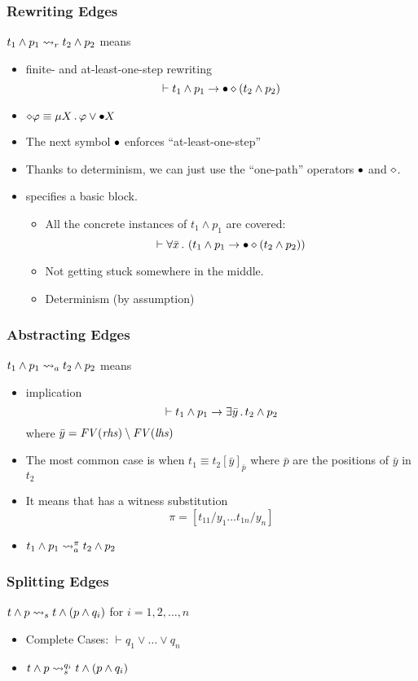 \documentclass{beamer}
\begin{document}
\begin{frame}
\frametitle{Rewriting Edges}
$t_1 \land p_1 \rightsquigarrow_r t_2 \land p_2$ means
\begin{itemize}
\item finite- and at-least-one-step rewriting 
      \begin{equation}\label{eq:tor}
      \vdash t_1 \land p_1 \rightarrow \mathord{\bullet} \diamond (t_2 \land p_2)
      \end{equation}
\item $\diamond \varphi \equiv \mu X \,.\, \varphi \lor \mathord{\bullet} X$
\item The next symbol $\mathord{\bullet}$ enforces ``at-least-one-step''
\item Thanks to determinism, we can just use the ``one-path'' operators
      $\mathord{\bullet}$ and $\diamond$.
\item {} specifies a basic block.
\begin{itemize}
\item All the concrete instances of $t_1 \land p_1$ are covered:
\[\vdash \forall \bar{x}
   \,.\, \left( t_1 \land p_1 \rightarrow \mathord{\bullet} \diamond (t_2 \land p_2) \right)\]
\item Not getting stuck somewhere in the middle.
\item Determinism (by assumption)
\end{itemize}
\end{itemize}
\end{frame}

\begin{frame}
\frametitle{Abstracting Edges}
$t_1 \land p_1 \rightsquigarrow_a t_2 \land p_2$ means
\begin{itemize}
\item implication
      \begin{equation}\label{eq:toa}
      \vdash t_1 \land p_1 \rightarrow \exists \bar{y} \,.\, t_2 \land p_2
      \end{equation}
      where $\bar{y} = \mathit{FV(rhs)} \setminus \mathit{FV(lhs)}$
\item The most common case is when
      $t_1 \equiv t_2[\bar{y}]_{\bar{p}}$ where $\bar{p}$ are the positions of $\bar{y}$ in $t_2$
\item It means that  has a witness substitution
      \[\pi = [t_{11} / y_1 \dots t_{1n} / y_n]\]
\item $t_1 \land p_1 \rightsquigarrow_a^\pi t_2 \land p_2$
\end{itemize}
\end{frame}

\begin{frame}
\frametitle{Splitting Edges}
$t \land p \rightsquigarrow_s t \land (p \land q_i)$ for $i = 1, 2, \dots, n$
\begin{itemize}
\item Complete Cases: $\vdash q_1 \lor \dots \lor q_n$
\item $t \land p \rightsquigarrow_s^{q_i} t \land (p \land q_i)$
\end{itemize}
\end{frame}
\end{document}
